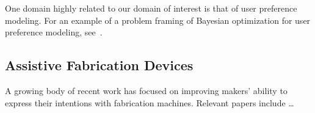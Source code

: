 One domain highly related to our domain of interest is that of user preference modeling.
For an example of a problem framing of Bayesian optimization for user preference modeling, see~\cite{brochu_tutorial_2010}.

\subsection{Assistive Fabrication Devices}

A growing body of recent work has focused on improving makers' ability to express their intentions with fabrication machines.
Relevant papers include \ldots
